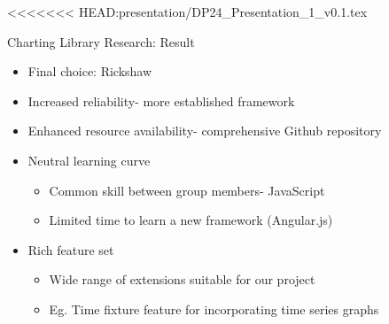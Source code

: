 \documentclass{beamer}
\begin{document}
<<<<<<< HEAD:presentation/DP24_Presentation_1_v0.1.tex
\begin{frame}{Charting Library Research: Result}
\begin{itemize}
	\item Final choice: Rickshaw
	\item Increased reliability- more established framework
	\item Enhanced resource availability- comprehensive Github repository
	\item Neutral learning curve
		\begin{itemize}
			\item Common skill between group members- JavaScript
			\item Limited time to learn a new framework (Angular.js)
		\end{itemize}
	\item Rich feature set
		\begin{itemize}
			\item Wide range of extensions suitable for our project
			\item Eg. Time fixture feature for incorporating time series graphs
		\end{itemize}
\end{itemize}
\end{frame}
\end{document}
